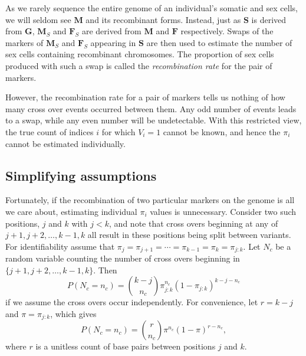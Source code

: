 \documentclass{article}
\newcommand{\m}[1]{\mathbf{#1}}               %
\begin{document}
As we rarely sequence the entire genome of an individual's somatic and sex cells, we will seldom see $\m{M}$ and its recombinant forms. Instead, just as $\m{S}$ is derived from $\m{G}$, $\m{M}_S$ and $\m{F}_S$ are derived from $\m{M}$ and $\m{F}$ respectively. Swaps of the markers of $\m{M}_S$ and $\m{F}_S$ appearing in $\m{S}$ are then used to estimate the number of sex cells containing recombinant chromosomes. The proportion of sex cells produced with such a swap is called the \textit{recombination rate} for the pair of markers.

However, the recombination rate for a pair of markers tells us nothing of how many cross over events occurred between them. Any odd number of events leads to a swap, while any even number will be undetectable. With this restricted view, the true count of indices $i$ for which $V_i = 1$ cannot be known, and hence the $\pi_i$ cannot be estimated individually.

\subsection{Simplifying assumptions} \label{subsec:simplify}

Fortunately, if the recombination of two particular markers on the genome is all we care about, estimating individual $\pi_i$ values is unnecessary. Consider two such positions, $j$ and $k$ with $j < k$, and note that cross overs beginning at any of $j+1, j+2, \dots, k-1, k$ all result in these positions being split between variants. For identifiability assume that $\pi_j = \pi_{j+1} = \cdots = \pi_{k-1} = \pi_k = \pi_{j:k}$. Let $N_c$ be a random variable counting the number of cross overs beginning in $\{j+1,j+2,\dots,k-1,k\}$. Then
$$P(N_c = n_c) = {k - j \choose n_c} \pi_{j:k}^{n_c} (1-\pi_{j:k})^{k - j - n_c}$$
if we assume the cross overs occur independently. For convenience, let $r = k - j$ and $\pi = \pi_{j:k}$, which gives
\begin{equation} \label{eq:binomialDist}
  P(N_c = n_c) = {r \choose n_c} \pi^{n_c} (1-\pi)^{r - n_c},
\end{equation}
where $r$ is a unitless count of base pairs between positions $j$ and $k$.
\end{document}
